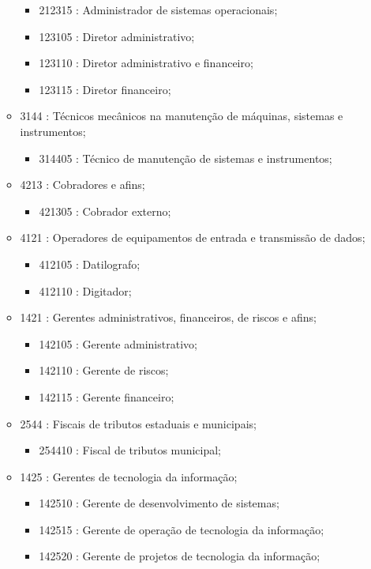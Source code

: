 \begin{itemize}
\begin{itemize}
\begin{itemize}
      \item 212315 : Administrador de sistemas operacionais;
      \item 123105 : Diretor administrativo;
      \item 123110 : Diretor administrativo e financeiro;
      \item 123115 : Diretor financeiro;
    \end{itemize}
    \item 3144 : Técnicos mecânicos na manutenção de máquinas, sistemas e instrumentos;
    \begin{itemize}
      \item 314405 : Técnico de manutenção de sistemas e instrumentos;
    \end{itemize}
    \item 4213 : Cobradores e afins;
    \begin{itemize}
      \item 421305 : Cobrador externo;
    \end{itemize}
    \item 4121 : Operadores de equipamentos de entrada e transmissão de dados;
    \begin{itemize}
      \item 412105 : Datilografo;
      \item 412110 : Digitador;
    \end{itemize}
    \item 1421 : Gerentes administrativos, financeiros, de riscos e afins;
    \begin{itemize}
      \item 142105 : Gerente administrativo;
      \item 142110 : Gerente de riscos;
      \item 142115 : Gerente financeiro;
    \end{itemize}
    \item 2544 : Fiscais de tributos estaduais e municipais;
    \begin{itemize}
      \item 254410 : Fiscal de tributos municipal;
    \end{itemize}
    \item 1425 : Gerentes de tecnologia da informação;
    \begin{itemize}
      \item 142510 : Gerente de desenvolvimento de sistemas;
      \item 142515 : Gerente de operação de tecnologia da informação;
      \item 142520 : Gerente de projetos de tecnologia da informação;

\end{itemize}
\end{itemize}
\end{itemize}
